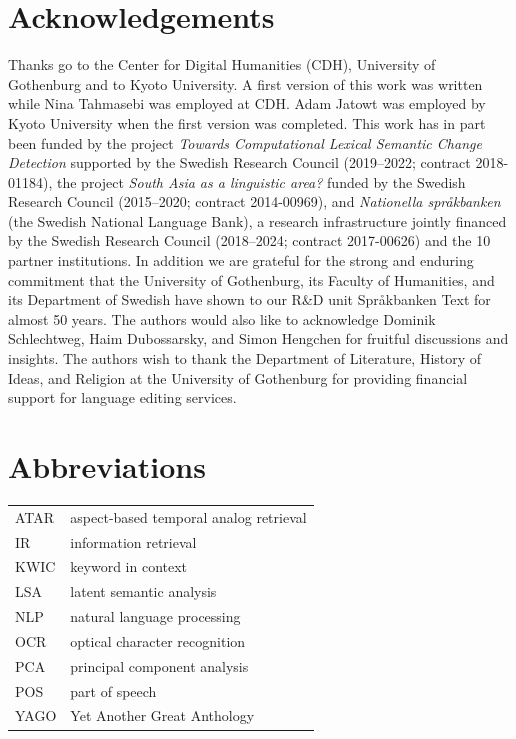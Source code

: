 \documentclass[output=paper]{langsci/langscibook}
\begin{document}
\section*{Acknowledgements}
Thanks go to the Center for Digital Humanities (CDH), University of Gothenburg and to Kyoto University. A first version of this work was written while Nina Tahmasebi was employed at CDH. Adam Jatowt was employed by Kyoto University when the first version was completed. This work has in part been funded by the project \textit{Towards Computational Lexical Semantic Change Detection} supported  by the Swedish Research Council (2019–2022; contract 2018-01184), the project \emph{South Asia as a linguistic area?} funded by the Swedish Research Council (2015--2020; contract 2014-00969), and \emph{Nationella språkbanken} (the Swedish National Language Bank), a research infrastructure jointly financed  by the Swedish Research Council (2018--2024; contract 2017-00626) and the 10 partner institutions. In
addition we are grateful for the strong and enduring commitment that the
University of Gothenburg, its Faculty of Humanities, and its
Department of Swedish have shown to our R\&D unit Språkbanken Text for
almost 50 years. 
The authors would also like to acknowledge Dominik Schlechtweg, Haim Dubossarsky, and Simon Hengchen for fruitful discussions and insights.  
The authors wish to thank the Department of Literature, History of Ideas, and Religion at the University of Gothenburg for providing financial support for language editing services.


\section*{Abbreviations}
\begin{tabularx}{\textwidth}{@{}lQ@{}}
ATAR & aspect-based temporal analog retrieval\\
IR & information retrieval\\
KWIC & keyword in context\\
LSA & latent semantic analysis\\
NLP & natural language processing\\
OCR & optical character recognition\\
PCA & principal component analysis\\
POS & part of speech\\
YAGO & Yet Another Great Anthology\\
\end{tabularx}


{\sloppy\printbibliography[heading=subbibliography,notkeyword=this]}
\end{document}

